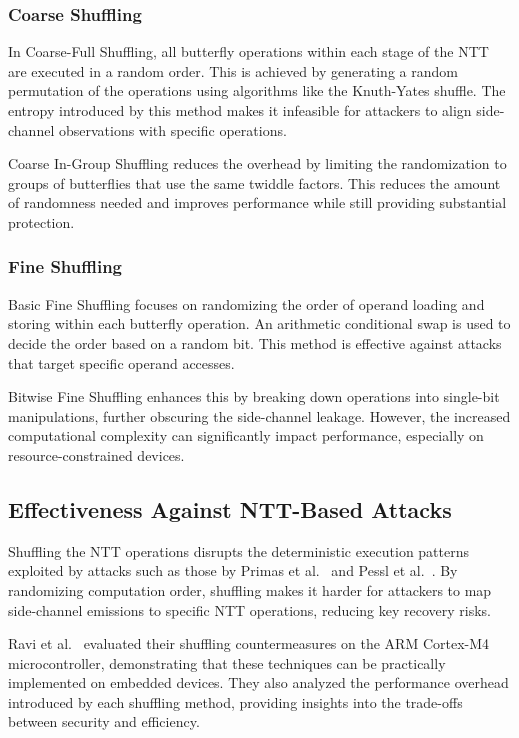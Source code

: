 \subsubsection{Coarse Shuffling}

In Coarse-Full Shuffling, all butterfly operations within each stage of the \ac{NTT} are executed in a random order. This is achieved by generating a random permutation of the operations using algorithms like the Knuth-Yates shuffle. The entropy introduced by this method makes it infeasible for attackers to align side-channel observations with specific operations.

Coarse In-Group Shuffling reduces the overhead by limiting the randomization to groups of butterflies that use the same twiddle factors. This reduces the amount of randomness needed and improves performance while still providing substantial protection.

\subsubsection{Fine Shuffling}

Basic Fine Shuffling focuses on randomizing the order of operand loading and storing within each butterfly operation. An arithmetic conditional swap is used to decide the order based on a random bit. This method is effective against attacks that target specific operand accesses.

Bitwise Fine Shuffling enhances this by breaking down operations into single-bit manipulations, further obscuring the side-channel leakage. However, the increased computational complexity can significantly impact performance, especially on resource-constrained devices.

\subsection{Effectiveness Against NTT-Based Attacks}

Shuffling the \ac{NTT} operations disrupts the deterministic execution patterns exploited by attacks such as those by Primas et al.~\cite{Primas17} and Pessl et al.~\cite{Pessl19}. By randomizing computation order, shuffling makes it harder for attackers to map side-channel emissions to specific \ac{NTT} operations, reducing key recovery risks.

Ravi et al.~\cite{Ravi20} evaluated their shuffling countermeasures on the ARM Cortex-M4 microcontroller, demonstrating that these techniques can be practically implemented on embedded devices. They also analyzed the performance overhead introduced by each shuffling method, providing insights into the trade-offs between security and efficiency.